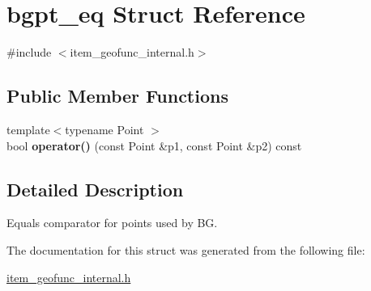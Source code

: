 \hypertarget{structbgpt__eq}{}\section{bgpt\+\_\+eq Struct Reference}
\label{structbgpt__eq}


{\ttfamily \#include $<$item\+\_\+geofunc\+\_\+internal.\+h$>$}

\subsection*{Public Member Functions}
\begin{DoxyCompactItemize}
\item 
\mbox{\label{structbgpt__eq_acb3ad35fc1965e564ec271442776b568}} 
{\footnotesize template$<$typename Point $>$ }\\bool {\bfseries operator()} (const Point \&p1, const Point \&p2) const
\end{DoxyCompactItemize}


\subsection{Detailed Description}
Equals comparator for points used by BG. 

The documentation for this struct was generated from the following file\+:\begin{DoxyCompactItemize}
\item 
\mbox{\hyperlink{item__geofunc__internal_8h}{item\+\_\+geofunc\+\_\+internal.\+h}}\end{DoxyCompactItemize}
